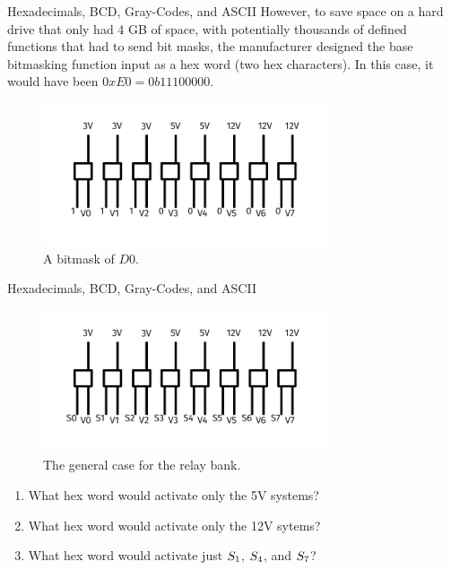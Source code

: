 \documentclass{beamer}
\begin{document}
\begin{frame}{Hexadecimals, BCD, Gray-Codes, and ASCII}
\small However, to save space on a hard drive that only had 4 GB of space, with potentially thousands of defined functions that had to send bit masks, the manufacturer designed the base bitmasking function input as a hex word (two hex characters).  In this case, it would have been $0xE0 = 0b11100000$.
\begin{figure}
\centering
\includegraphics[width=0.75\textwidth,trim=0cm 1cm 0cm 0.5cm,clip=true]{figures/RelayBank2.pdf}
\caption{\label{fig:relay3} \small A bitmask of $D0$.}
\end{figure}
\end{frame}

\begin{frame}{Hexadecimals, BCD, Gray-Codes, and ASCII}
\begin{figure}
\centering
\includegraphics[width=0.75\textwidth,trim=0cm 1cm 0cm 0.5cm,clip=true]{figures/RelayBank.pdf}
\caption{\label{fig:relay4} \small The general case for the relay bank.}
\end{figure}
\small
\begin{enumerate}
\item What hex word would activate only the 5V systems?
\item What hex word would activate only the 12V sytems?
\item What hex word would activate just $S_{\rm 1}$, $S_{\rm 4}$, and $S_{\rm 7}$?
\end{enumerate}
\end{frame}
\end{document}
